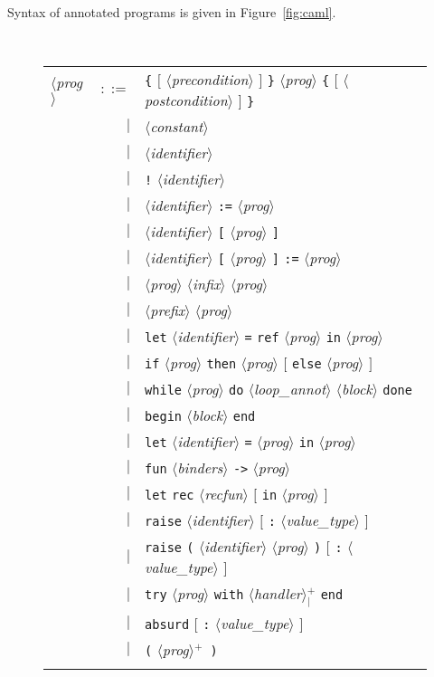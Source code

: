 \documentclass[a4paper,12pt]{report}
\makeatletter
\newcommand{\te}[1]{\texttt{#1}}
\newcommand{\nt}[1]{$\langle$\textsl{#1}$\rangle$}
\newcommand{\indexnt}[1]{\index{#1@\textsl{#1}, grammar entry}}
\newcommand{\indextt}[1]{\index{#1@\texttt{#1}}}
\newcommand{\plus}{$^+$}
\newcommand{\plussep}[1]{$^+_#1$}
\makeatother
\begin{document}
Syntax of annotated programs is given in Figure~\ref{fig:caml}.
\begin{figure}[htbp]
\begin{center}
\hrulefill\\
\begin{tabular}{lrl}
  \nt{prog}\indexnt{prog}
    & $::=$ & \te{\{} $[$ \nt{precondition} $]$ \te{\}}
              \nt{prog} 
              \te{\{} $[$ \nt{postcondition} $]$ \te{\}} \\
      & $|$ & \nt{constant} \\
      & $|$ & \nt{identifier} \\
      & $|$ & \te{!} \nt{identifier} \\
      & $|$ & \nt{identifier} \te{:=} \nt{prog} \\
      & $|$ & \nt{identifier} \te{[} \nt{prog} \te{]} \\
      & $|$ & \nt{identifier} \te{[} \nt{prog} \te{]} \te{:=} \nt{prog} \\
      & $|$ & \nt{prog} \nt{infix} \nt{prog} \\
      & $|$ & \nt{prefix} \nt{prog} \\
      & $|$ & \te{let} \nt{identifier} \te{=} \te{ref} 
              \nt{prog} \te{in} \nt{prog} \\
      & $|$ & \te{if} \nt{prog} \te{then} \nt{prog}
              $[$ \te{else} \nt{prog} $]$ \\
      & $|$ & \te{while} \nt{prog} \te{do}
              \nt{loop\_annot} \nt{block} \te{done} \\
      & $|$ & \te{begin} \nt{block} \te{end} \\
      & $|$ & \te{let} \nt{identifier} \te{=} \nt{prog} 
              \te{in} \nt{prog} \\
      & $|$ & \te{fun} \nt{binders} \te{->} \nt{prog} \\
      & $|$ & \te{let} \te{rec} \nt{recfun} $[$ \te{in} \nt{prog} $]$ \\
      & $|$ & \te{raise} \nt{identifier} $[$ \te{:} \nt{value\_type} $]$ \\
      & $|$ & \te{raise} \te{(} \nt{identifier} \nt{prog} \te{)}
              $[$ \te{:} \nt{value\_type} $]$ \\
      & $|$ & \te{try} \nt{prog} \te{with} 
              \nt{handler}\plussep{\te{|}} \te{end} \\
      & $|$ & \te{absurd} $[$ \te{:} \nt{value\_type} $]$ \\ \indextt{absurd}
      & $|$ & \te{(} \nt{prog}\plus\  \te{)} \\
  \\[0.1em]


\end{tabular}
\end{center}
\end{figure}
\end{document}
